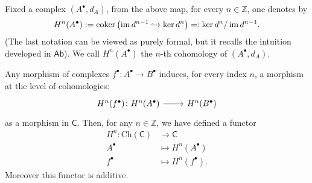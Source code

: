 \documentclass[../Main]{subfiles}
\begin{document}
\begin{defn}
	Fixed a complex $\left( A^{\bullet}, d_{A} \right)$,
	from the above map, for every $n \in \mathbb{Z}$, one denotes by
	\begin{equation}
		H^n(A^\bullet) := \operatorname{coker} \left( \operatorname{im} d^{n-1}
		\hookrightarrow \ker d^{n}\right) =:
		\ker d^{n} / \operatorname{im} d^{n-1}
	.\end{equation} 
	(The last notation can be viewed as purely formal, but it recalls
	the intuition developed in $\mathsf{Ab}$).
	We call $H^n(A^\bullet)$ the $n$-th cohomology of $\left( A^{\bullet}, d_{A} \right)$.
\end{defn}

\begin{exr}
	Any morphism of complexes $f^\bullet\colon A^\bullet \to B^\bullet$
	induces, for every index $n$, a morphism at the level of cohomologies:
	\begin{equation}
	\begin{tikzcd}
		H^n(f^\bullet) \colon H^n(A^\bullet) \arrow[r, "", rightarrow] &
		H^n(B^\bullet)
	\end{tikzcd}
	\end{equation} 
	as a morphism in $\mathsf{C}$.
	Then, for any $n \in \mathbb{Z}$, we have defined a functor
	\begin{align}
		H^n\colon \mathrm{Ch}(\mathsf{C}) &\longrightarrow \mathsf{C} \\
		A^\bullet &\longmapsto H^n(A^\bullet) \nonumber \\
		f^\bullet &\longmapsto H^n(f^\bullet) \nonumber
	.\end{align} 
	Moreover this functor is additive.
\end{exr} 
\end{document}
